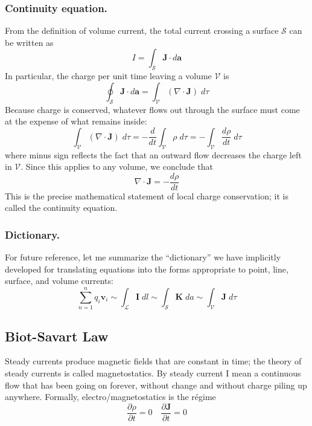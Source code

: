 \documentclass[../../../main.tex]{subfiles}
\begin{document}
\subsubsection*{Continuity equation.} From the definition of volume current, the total current crossing a surface $\mathcal{S}$ can be written as
\begin{equation*}
    I=\int_{\mathcal{S}}\mathbf{J}\cdot d\mathbf{a}
\end{equation*}
In particular, the charge per unit time leaving a volume $\mathcal{V}$ is
\begin{equation*}
    \oint_{\mathcal{S}} \mathbf{J}\cdot d\mathbf{a}=\int_{\mathcal{V}}(\nabla\cdot\mathbf{J}) \;d\tau
\end{equation*}
Because charge is conserved, whatever ﬂows out through the surface must come at the expense of what remains inside:
\begin{equation*}
    \int_{\mathcal{V}}(\nabla\cdot\mathbf{J}) \;d\tau=-\frac{d}{dt}\int_\mathcal{V}\rho\;d\tau= -\int_\mathcal{V}\frac{d\rho}{dt}\;d\tau
\end{equation*}
where minus sign reﬂects the fact that an outward ﬂow decreases the charge left in $\mathcal{V}$. Since this applies to any volume, we conclude that
\begin{equation*}
    \nabla\cdot\mathbf{J}=-\frac{d\rho}{dt}
\end{equation*}
This is the precise mathematical statement of local charge conservation; it is called the continuity equation.

\subsubsection*{Dictionary.} For future reference, let me summarize the “dictionary” we have implicitly developed for translating equations into the forms appropriate to point, line, surface, and volume currents:
\begin{equation*}
    \sum_{n=1}^{n}q_i\mathbf{v}_i\sim\int_\mathcal{L}\mathbf{I}\;dl \sim \int_\mathcal{S}\mathbf{K}\;da \sim \int_\mathcal{V}\mathbf{J}\;d\tau
\end{equation*}

\subsection*{Biot-Savart Law}
Steady currents produce magnetic ﬁelds that are constant in time; the theory of steady currents is called magnetostatics. By steady current I mean a continuous ﬂow that has been going on forever, without change and without charge piling up anywhere. Formally, electro/magnetostatics is the régime
\begin{equation*}
    \frac{\partial\rho}{\partial t}=0 \quad\frac{\partial \mathbf{J}}{\partial t}=0
\end{equation*}
\end{document}
